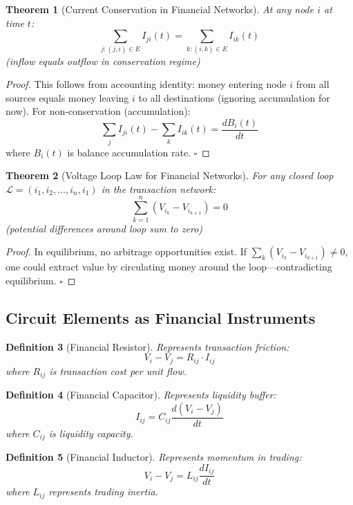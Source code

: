 \documentclass[12pt]{article}
\newtheorem{theorem}{Theorem}
\newtheorem{definition}[theorem]{Definition}
\begin{document}
\begin{theorem}[Current Conservation in Financial Networks]
At any node $i$ at time $t$:
$$
\sum_{j: (j,i) \in E} I_{ji}(t) = \sum_{k: (i,k) \in E} I_{ik}(t)
$$
(inflow equals outflow in conservation regime)
\end{theorem}

\begin{proof}
This follows from accounting identity: money entering node $i$ from all sources equals money leaving $i$ to all destinations (ignoring accumulation for now). For non-conservation (accumulation):
$$
\sum_{j} I_{ji}(t) - \sum_{k} I_{ik}(t) = \frac{dB_i(t)}{dt}
$$
where $B_i(t)$ is balance accumulation rate.
$\square$
\end{proof}

\begin{theorem}[Voltage Loop Law for Financial Networks]
For any closed loop $\mathcal{L} = (i_1, i_2, \ldots, i_n, i_1)$ in the transaction network:
$$
\sum_{k=1}^{n} (V_{i_k} - V_{i_{k+1}}) = 0
$$
(potential differences around loop sum to zero)
\end{theorem}

\begin{proof}
In equilibrium, no arbitrage opportunities exist. If $\sum_k (V_{i_k} - V_{i_{k+1}}) \neq 0$, one could extract value by circulating money around the loop—contradicting equilibrium.
$\square$
\end{proof}

\subsection{Circuit Elements as Financial Instruments}

\begin{definition}[Financial Resistor]
Represents transaction friction:
$$
V_i - V_j = R_{ij} \cdot I_{ij}
$$
where $R_{ij}$ is transaction cost per unit flow.
\end{definition}

\begin{definition}[Financial Capacitor]
Represents liquidity buffer:
$$
I_{ij} = C_{ij} \frac{d(V_i - V_j)}{dt}
$$
where $C_{ij}$ is liquidity capacity.
\end{definition}

\begin{definition}[Financial Inductor]
Represents momentum in trading:
$$
V_i - V_j = L_{ij} \frac{dI_{ij}}{dt}
$$
where $L_{ij}$ represents trading inertia.
\end{definition}
\end{document}
